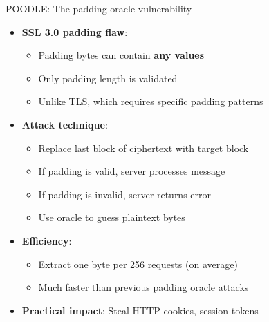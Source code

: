 \documentclass[aspectratio=169, lualatex, handout]{beamer}
\begin{document}
\begin{frame}{POODLE: The padding oracle vulnerability}
	\begin{itemize}[<+->]
		\item \textbf{SSL 3.0 padding flaw}:
		      \begin{itemize}
			      \item Padding bytes can contain \textbf{any values}
			      \item Only padding length is validated
			      \item Unlike TLS, which requires specific padding patterns
		      \end{itemize}
		\item \textbf{Attack technique}:
		      \begin{itemize}
			      \item Replace last block of ciphertext with target block
			      \item If padding is valid, server processes message
			      \item If padding is invalid, server returns error
			      \item Use oracle to guess plaintext bytes
		      \end{itemize}
		\item \textbf{Efficiency}:
		      \begin{itemize}
			      \item Extract one byte per 256 requests (on average)
			      \item Much faster than previous padding oracle attacks
		      \end{itemize}
		\item \textbf{Practical impact}: Steal HTTP cookies, session tokens
	\end{itemize}
\end{frame}
\end{document}

